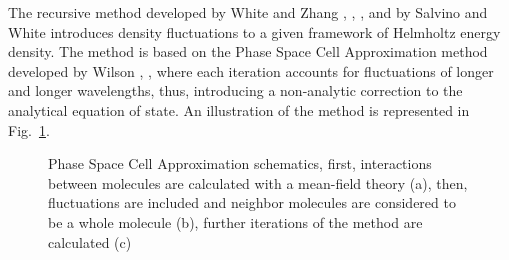 \documentclass[preprint,12pt,3p]{elsarticle}
\begin{document}
	The recursive method developed by White and Zhang \citep{white1993renormalization}, \citep{white1995renormalization}, \citep{white1998renormalization}, and by Salvino and White \citep{salvino1992calculation} introduces density fluctuations to a given framework of Helmholtz energy density. The method is based on the Phase Space Cell Approximation method developed by Wilson \citep{wilson1971renormalization}, \citep{wilson1971brenormalization}, where each iteration accounts for fluctuations of longer and longer wavelengths, thus, introducing a non-analytic correction to the analytical equation of state. An illustration of the method is represented in Fig.~\ref{fig:schematics}.

\begin{figure}[h!]
\centering
\captionsetup{justification=centering}
\caption{Phase Space Cell Approximation schematics, first, interactions between molecules are calculated with a mean-field theory (a), then, fluctuations are included and neighbor molecules are considered to be a whole molecule (b), further iterations of the method are calculated (c)}
\label{fig:schematics}
\end{figure}
    
\end{document}
